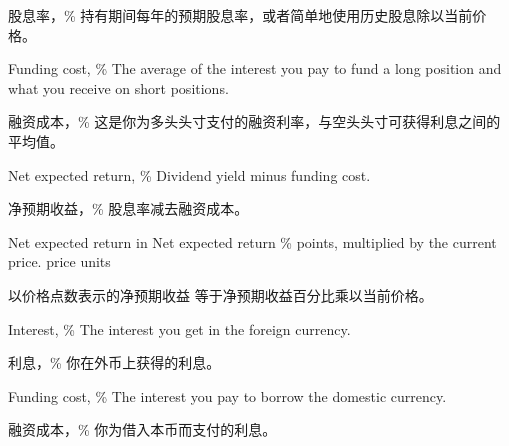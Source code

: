 \begin{chineseblock}股息率，\% 持有期间每年的预期股息率，或者简单地使用历史股息除以当前价格。\end{chineseblock}

\bipairgap

\begin{englishblock} Funding cost, \% The average of the interest you pay to fund a long position and what you receive on short positions. \end{englishblock}

\begin{chineseblock}融资成本，\% 这是你为多头头寸支付的融资利率，与空头头寸可获得利息之间的平均值。\end{chineseblock}

\bipairgap

\begin{englishblock} Net expected return, \% Dividend yield minus funding cost. \end{englishblock}

\begin{chineseblock}净预期收益，\% 股息率减去融资成本。\end{chineseblock}

\bipairgap

\begin{englishblock} Net expected return in Net expected return \% points, multiplied by the current price. price units \end{englishblock}

\begin{chineseblock}以价格点数表示的净预期收益 等于净预期收益百分比乘以当前价格。\end{chineseblock}


\begin{englishblock} Interest, \% The interest you get in the foreign currency. \end{englishblock}

\begin{chineseblock}利息，\% 你在外币上获得的利息。\end{chineseblock}

\bipairgap

\begin{englishblock} Funding cost, \% The interest you pay to borrow the domestic currency. \end{englishblock}

\begin{chineseblock}融资成本，\% 你为借入本币而支付的利息。\end{chineseblock}

